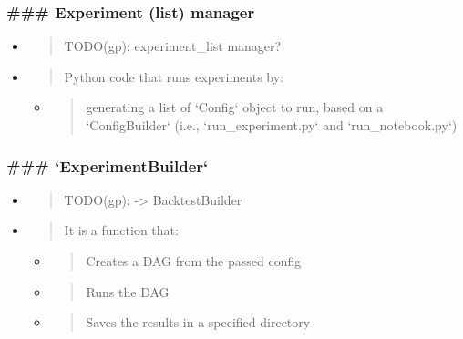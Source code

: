 \documentclass[11pt, reqno]{amsart}
\begin{document}
\hypertarget{experiment-list-manager}{%
\subsubsection{\texorpdfstring{\textbf{\#\#\# Experiment (list)
manager}}{\#\#\# Experiment (list) manager}}\label{experiment-list-manager}}

\begin{itemize}
\item
  \begin{quote}
  TODO(gp): experiment\_list manager?
  \end{quote}
\item
  \begin{quote}
  Python code that runs experiments by:
  \end{quote}

  \begin{itemize}
  \item
    \begin{quote}
    generating a list of `Config` object to run, based on a
    `ConfigBuilder` (i.e., `run\_experiment.py` and `run\_notebook.py`)
    \end{quote}
  \end{itemize}
\end{itemize}

\hypertarget{experimentbuilder}{%
\subsubsection{\texorpdfstring{\textbf{\#\#\#
`ExperimentBuilder`}}{\#\#\# `ExperimentBuilder`}}\label{experimentbuilder}}

\begin{itemize}
\item
  \begin{quote}
  TODO(gp): -\textgreater{} BacktestBuilder
  \end{quote}
\item
  \begin{quote}
  It is a function that:
  \end{quote}

  \begin{itemize}
  \item
    \begin{quote}
    Creates a DAG from the passed config
    \end{quote}
  \item
    \begin{quote}
    Runs the DAG
    \end{quote}
  \item
    \begin{quote}
    Saves the results in a specified directory
    \end{quote}
  \end{itemize}
\end{itemize}
\end{document}
